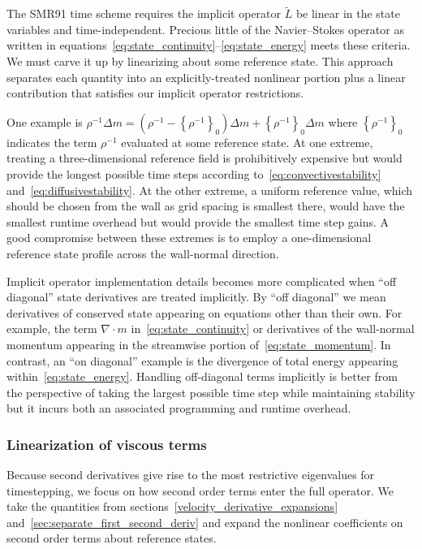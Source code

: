 \documentclass[letterpaper,11pt,nointlimits,reqno,draft]{amsart}
\newcommand{\reference}[1]{\ensuremath{\left\{#1\right\}_{0}}}
\newcommand{\lessreference}[1]
  {\ensuremath{\left({#1}-\reference{#1}\right)}}
\begin{document}
The SMR91 time scheme requires the implicit operator $\tilde{L}$ be linear in
the state variables and time-independent.  Precious little of the
Navier--Stokes operator as written in
equations~\eqref{eq:state_continuity}--\eqref{eq:state_energy} meets these
criteria.  We must carve it up by linearizing about some reference state.  This
approach separates each quantity into an explicitly-treated nonlinear portion
plus a linear contribution that satisfies our implicit operator restrictions.

One example is $\rho^{-1}\Delta{}m = \lessreference{\rho^{-1}}\Delta{}m +
\reference{\rho^{-1}}\Delta{}m$ where $\reference{\rho^{-1}}$ indicates the
term $\rho^{-1}$ evaluated at some reference state.  At one extreme, treating a
three-dimensional reference field is prohibitively expensive but would provide
the longest possible time steps according to~\eqref{eq:convectivestability}
and~\eqref{eq:diffusivestability}.  At the other extreme, a uniform reference
value, which should be chosen from the wall as grid spacing is smallest there,
would have the smallest runtime overhead but would provide the smallest time
step gains.  A good compromise between these extremes is to employ a
one-dimensional reference state profile across the wall-normal direction.

Implicit operator implementation details becomes more complicated when ``off
diagonal'' state derivatives are treated implicitly.  By ``off diagonal'' we
mean derivatives of conserved state appearing on equations other than their
own.  For example, the term $\nabla\cdot{}m$ in~\eqref{eq:state_continuity} or
derivatives of the wall-normal momentum appearing in the streamwise portion
of~\eqref{eq:state_momentum}.  In contrast, an ``on diagonal'' example is the
divergence of total energy appearing within~\eqref{eq:state_energy}.  Handling
off-diagonal terms implicitly is better from the perspective of taking the
largest possible time step while maintaining stability but it incurs both an
associated programming and runtime overhead.

\subsubsection{Linearization of viscous terms}

Because second derivatives give rise to the most restrictive eigenvalues for
timestepping, we focus on how second order terms enter the full operator.  We
take the quantities from sections~\ref{velocity_derivative_expansions}
and~\ref{sec:separate_first_second_deriv} and expand the nonlinear coefficients on
second order terms about reference states.
\end{document}

